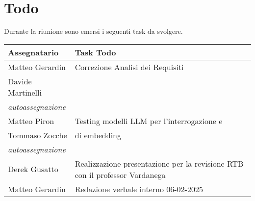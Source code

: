 \section{Todo}
Durante la riunione sono emersi i seguenti task da svolgere.

\begin{center}
  \begin{tabular}{|L{5cm}|L{8cm}|}
    \hline
    \textbf{Assegnatario} & \textbf{Task Todo} \\ \hline
        Matteo Gerardin & Correzione Analisi dei Requisiti \\ 
        Davide Martinelli & \\
        \textit{autoassegnazione} & \\ \hline
        Matteo Piron & Testing modelli LLM per l'interrogazione e \\ 
        Tommaso Zocche & di embedding\\
        \textit{autoassegnazione} & \\ \hline
        Derek Gusatto & Realizzazione presentazione per la revisione RTB con il professor Vardanega \\ \hline
        Matteo Gerardin & Redazione verbale interno 06-02-2025 \\ \hline
  \end{tabular}
\end{center}